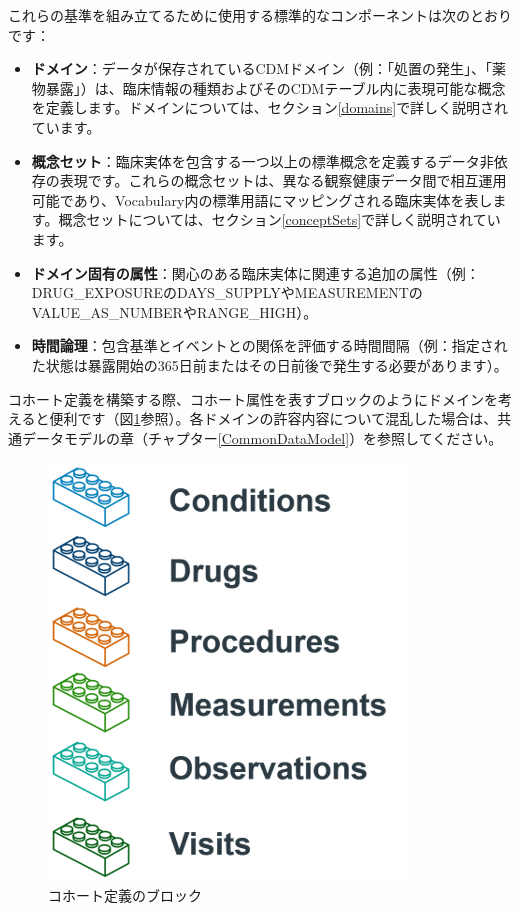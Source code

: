 \documentclass[
  11pt]{book}
\theoremstyle{definition}
\theoremstyle{definition}
\theoremstyle{definition}
\theoremstyle{definition}
\theoremstyle{remark}
\begin{document}
これらの基準を組み立てるために使用する標準的なコンポーネントは次のとおりです：

\begin{itemize}
\item
  \textbf{ドメイン}：データが保存されているCDMドメイン（例：「処置の発生」、「薬物暴露」）は、臨床情報の種類およびそのCDMテーブル内に表現可能な概念を定義します。ドメインについては、セクション\ref{domains}で詳しく説明されています。
\item
  \textbf{概念セット}：臨床実体を包含する一つ以上の標準概念を定義するデータ非依存の表現です。これらの概念セットは、異なる観察健康データ間で相互運用可能であり、Vocabulary内の標準用語にマッピングされる臨床実体を表します。概念セットについては、セクション\ref{conceptSets}で詳しく説明されています。
\item
  \textbf{ドメイン固有の属性}：関心のある臨床実体に関連する追加の属性（例：DRUG\_EXPOSUREのDAYS\_SUPPLYやMEASUREMENTのVALUE\_AS\_NUMBERやRANGE\_HIGH）。
\item
  \textbf{時間論理}：包含基準とイベントとの関係を評価する時間間隔（例：指定された状態は暴露開始の365日前またはその日前後で発生する必要があります）。
\end{itemize}

コホート定義を構築する際、コホート属性を表すブロックのようにドメインを考えると便利です（図\ref{fig:cohortLegos}参照）。各ドメインの許容内容について混乱した場合は、共通データモデルの章（チャプター\ref{CommonDataModel}）を参照してください。

\begin{figure}

{\centering \includegraphics[width=0.5\linewidth]{images/Cohorts/cohort-legos} 

}

\caption{コホート定義のブロック}\label{fig:cohortLegos}
\end{figure}
\end{document}
